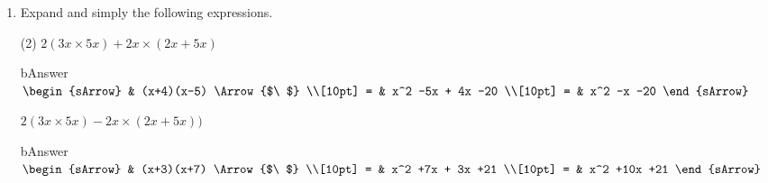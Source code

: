 \begin{enumerate}[resume]
  \item Expand and simply the following expressions.
  \begin{subtask}(2)
    \task[] $ 2(3x \times 5x) + 2x \times (2x + 5x)  $
              \begin{envOut}[equal height group=A-Rev-1]{bAnswer}
			       $\begin{sArrow}
			             & (x+4)(x-5)        \Arrow{$\ $} \\[10pt]
                       = & x^2 -5x + 4x -20              \\[10pt]      
					   = & x^2 -x -20 
	                \end{sArrow}$
              \end{envOut}
    \task[] $2(3x \times 5x) - 2x \times (2x + 5x) )$
              \begin{envOut}[equal height group=A-Rev-1]{bAnswer}
			       $\begin{sArrow}
			             & (x+3)(x+7)        \Arrow{$\ $} \\[10pt]
                       = & x^2 +7x + 3x +21               \\[10pt]      
					   = & x^2 +10x +21 
	                \end{sArrow}$
              \end{envOut}
  \end{subtask}
\end{enumerate}

